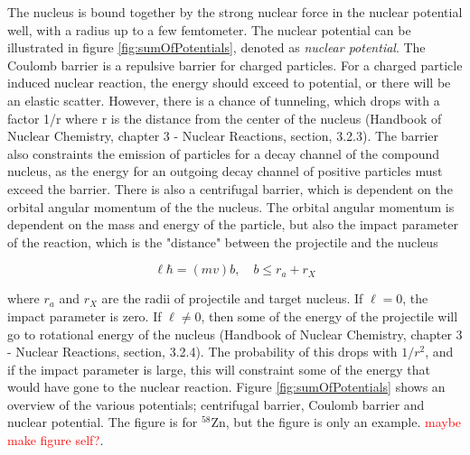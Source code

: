 \documentclass[a4paper,11pt,twoside]{book}
\begin{document}
The nucleus is bound together by the strong nuclear force in the nuclear potential well, with a radius up to a few femtometer. The nuclear potential can be illustrated in figure \ref{fig:sumOfPotentials}, denoted as \textit{nuclear potential}. The Coulomb barrier is a repulsive barrier for charged particles. For a charged particle induced nuclear reaction, the energy should exceed to potential, or there will be an elastic scatter. However, there is a chance of tunneling, which drops with a factor 1/r where r is the distance from the center of the nucleus (Handbook of Nuclear Chemistry, chapter 3 - Nuclear Reactions, section, 3.2.3). The barrier also constraints the emission of particles for a decay channel of the compound nucleus, as the energy for an outgoing decay channel of positive particles must exceed the barrier. There is also a centrifugal barrier, which is dependent on the orbital angular momentum of the the nucleus. The orbital angular momentum is dependent on the mass and energy of the particle, but also the impact parameter of the reaction, which is the "distance" between the projectile and the nucleus

\begin{equation}
    \ell\hbar = (mv)b, \quad b\leq r_a + r_X
\end{equation}

\noindent where $r_a$ and $r_X$ are the radii of projectile and target nucleus. If $\ell=0$, the impact parameter is zero. If $\ell\neq 0$, then some of the energy of the projectile will go to rotational energy of the nucleus (Handbook of Nuclear Chemistry, chapter 3 - Nuclear Reactions, section, 3.2.4). The probability of this drops with $1/r^2$, and if the impact parameter is large, this will constraint some of the energy that would have gone to the nuclear reaction. Figure \ref{fig:sumOfPotentials} shows an overview of the various potentials; centrifugal barrier, Coulomb barrier and nuclear potential. The figure is for $^{58}$Zn, but the figure is only an example. \textcolor{red}{maybe make figure self?}. 
\end{document}
